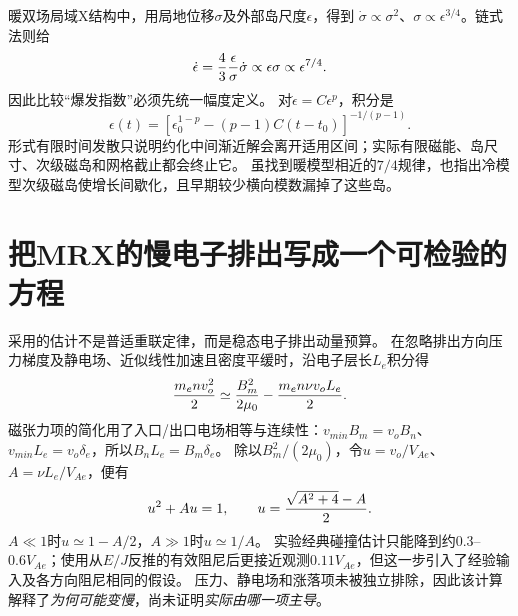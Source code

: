 暖双场局域X结构中，\citet{L214}用局地位移$\sigma$及外部岛尺度$\epsilon$，得到
$\dot\sigma\propto\sigma^2$、$\sigma\propto\epsilon^{3/4}$。链式法则给
\begin{equation}
 \dot\epsilon={4\over3}{\epsilon\over\sigma}\dot\sigma
 \propto\epsilon\sigma\propto\epsilon^{7/4}.
\end{equation}
因此比较“爆发指数”必须先统一幅度定义。
对$\dot\epsilon=C\epsilon^p$，积分是
\begin{equation}
 \epsilon(t)=\left[\epsilon_0^{1-p}-(p-1)C(t-t_0)\right]^{-1/(p-1)}.
\end{equation}
形式有限时间发散只说明约化中间渐近解会离开适用区间；实际有限磁能、岛尺寸、次级磁岛和网格截止都会终止它。
\citet{F697}虽找到暖模型相近的$7/4$规律，也指出冷模型次级磁岛使增长间歇化，且早期较少横向模数漏掉了这些岛。

\section{把MRX的慢电子排出写成一个可检验的方程}
\citet{L119}采用的估计不是普适重联定律，而是稳态电子排出动量预算。
在忽略排出方向压力梯度及静电场、近似线性加速且密度平缓时，沿电子层长$L_e$积分得
\begin{equation}
 {m_en v_o^2\over2}\simeq{B_m^2\over2\mu_0}
 -{m_en\nu v_oL_e\over2}.
\end{equation}
磁张力项的简化用了入口/出口电场相等与连续性：$v_{
m in}B_m=v_oB_n$、$v_{
m in}L_e=v_o\delta_e$，所以$B_nL_e=B_m\delta_e$。
除以$B_m^2/(2\mu_0)$，令$u=v_o/V_{\!Ae}$、$A=\nu L_e/V_{\!Ae}$，便有
\begin{equation}
 u^2+Au=1,\qquad u={\sqrt{A^2+4}-A\over2}.
\end{equation}
$A\ll1$时$u\simeq1-A/2$，$A\gg1$时$u\simeq1/A$。
实验经典碰撞估计只能降到约$0.3$--$0.6V_{\!Ae}$；使用从$E/J$反推的有效阻尼后更接近观测$0.11V_{\!Ae}$，但这一步引入了经验输入及各方向阻尼相同的假设。
压力、静电场和涨落项未被独立排除，因此该计算解释了\emph{为何可能变慢}，尚未证明\emph{实际由哪一项主导}。
